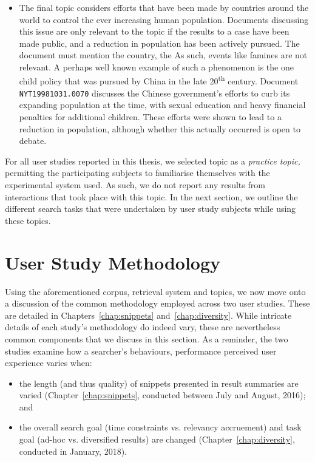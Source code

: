 \begin{itemize}
    \item{ The final topic considers efforts that have been made by countries around the world to control the ever increasing human population. Documents discussing this issue are only relevant to the topic if the results to a case have been made public, and a reduction in population has been actively pursued. The document must mention the country, the As such, events like famines are not relevant. A perhaps well known example of such a phenomenon is the one child policy that was pursued by China in the late 20\textsuperscript{th} century. Document \texttt{NYT19981031.0070} discusses the Chinese government's efforts to curb its expanding population at the time, with sexual education and heavy financial penalties for additional children. These efforts were shown to lead to a reduction in population, although whether this actually occurred is open to debate.}
    
\end{itemize}

For all user studies reported in this thesis, we selected topic  as a \emph{practice topic,} permitting the participating subjects to familiarise themselves with the experimental system used. As such, we do not report any results from interactions that took place with this topic. In the next section, we outline the different search tasks that were undertaken by user study subjects while using these topics.

\section{User Study Methodology}\label{sec:methodology:user}
Using the aforementioned corpus, retrieval system and topics, we now move onto a discussion of the common methodology employed across two user studies. These are detailed in Chapters~\ref{chap:snippets} and~\ref{chap:diversity}. While intricate details of each study's methodology do indeed vary, these are nevertheless common components that we discuss in this section. As a reminder, the two studies examine how a searcher's behaviours, performance perceived user experience varies when:

\begin{itemize}
    \item{the length (and thus quality) of snippets presented in result summaries are varied (Chapter~\ref{chap:snippets}, conducted between July and August, 2016); and}
    
    \item{the overall search goal (time constraints vs. relevancy accruement) and task goal (ad-hoc vs. diversified results) are changed (Chapter~\ref{chap:diversity}, conducted in January, 2018).}
\end{itemize}

